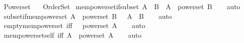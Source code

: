 %
\begin{isabellebody}%
%
%
\isadelimdocument
%
\endisadelimdocument
%
\isatagdocument
%
\isamarkuptrue%
%
\endisatagdocument
{\isafolddocument}%
%
\isadelimdocument
%
\endisadelimdocument
%
\isadelimtheory
%
\endisadelimtheory
%
\isatagtheory
{}\isamarkupfalse%
\ Powerset\isanewline
\ \ \ Order{\isacharunderscore}{\kern0pt}Set\isanewline
{}%
\endisatagtheory
{\isafoldtheory}%
%
\isadelimtheory
\isanewline
%
\endisadelimtheory
\isanewline
{}\isamarkupfalse%
\ mem{\isacharunderscore}{\kern0pt}powerset{\isacharunderscore}{\kern0pt}if{\isacharunderscore}{\kern0pt}subset{\isacharcolon}{\kern0pt}\ {\isachardoublequoteopen}A\ {\isasymsubseteq}\ B\ {\isasymLongrightarrow}\ A\ {\isasymin}\ powerset\ B{\isachardoublequoteclose}\isanewline
%
\isadelimproof
\ \ %
\endisadelimproof
%
\isatagproof
{}\isamarkupfalse%
\ auto%
\endisatagproof
{\isafoldproof}%
%
\isadelimproof
\isanewline
%
\endisadelimproof
\isanewline
{}\isamarkupfalse%
\ subset{\isacharunderscore}{\kern0pt}if{\isacharunderscore}{\kern0pt}mem{\isacharunderscore}{\kern0pt}powerset{\isacharcolon}{\kern0pt}\ {\isachardoublequoteopen}A\ {\isasymin}\ powerset\ B\ \ {\isasymLongrightarrow}\ A\ {\isasymsubseteq}\ B{\isachardoublequoteclose}\isanewline
%
\isadelimproof
\ \ %
\endisadelimproof
%
\isatagproof
{}\isamarkupfalse%
\ auto%
\endisatagproof
{\isafoldproof}%
%
\isadelimproof
\isanewline
%
\endisadelimproof
\isanewline
{}\isamarkupfalse%
\ empty{\isacharunderscore}{\kern0pt}mem{\isacharunderscore}{\kern0pt}powerset\ {\isacharbrackleft}{\kern0pt}iff{\isacharbrackright}{\kern0pt}{\isacharcolon}{\kern0pt}\ {\isachardoublequoteopen}{\isacharbraceleft}{\kern0pt}{\isacharbraceright}{\kern0pt}\ {\isasymin}\ powerset\ A{\isachardoublequoteclose}\isanewline
%
\isadelimproof
\ \ %
\endisadelimproof
%
\isatagproof
{}\isamarkupfalse%
\ auto%
\endisatagproof
{\isafoldproof}%
%
\isadelimproof
\isanewline
%
\endisadelimproof
\isanewline
{}\isamarkupfalse%
\ mem{\isacharunderscore}{\kern0pt}powerset{\isacharunderscore}{\kern0pt}self\ {\isacharbrackleft}{\kern0pt}iff{\isacharbrackright}{\kern0pt}{\isacharcolon}{\kern0pt}\ {\isachardoublequoteopen}A\ {\isasymin}\ powerset\ A{\isachardoublequoteclose}\isanewline
%
\isadelimproof
\ \ %
\endisadelimproof
%
\isatagproof
{}\isamarkupfalse%
\ auto%
\endisatagproof
{\isafoldproof}%
%
\isadelimproof
\isanewline
%
\endisadelimproof

\end{isabellebody}
